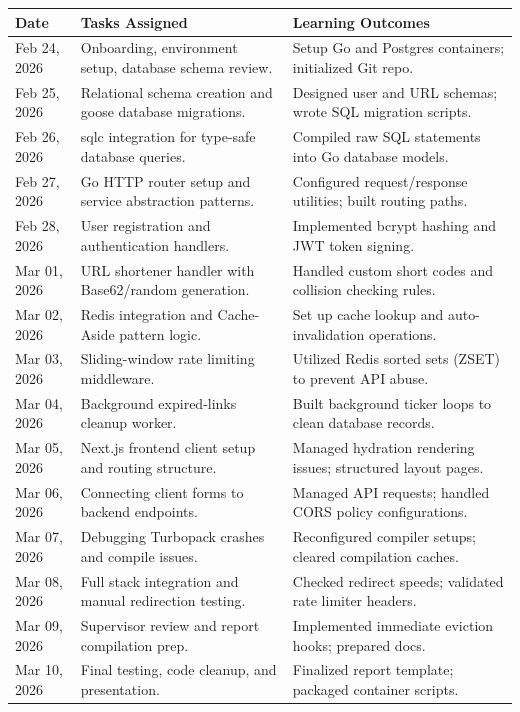 \begin{longtable}{|p{2.5cm}|p{6cm}|p{6.5cm}|}
    \hline
    \textbf{Date} & \textbf{Tasks Assigned} & \textbf{Learning Outcomes} \\
    \hline
    Feb 24, 2026 & Onboarding, environment setup, database schema review. & Setup Go and Postgres containers; initialized Git repo. \\
    \hline
    Feb 25, 2026 & Relational schema creation and goose database migrations. & Designed user and URL schemas; wrote SQL migration scripts. \\
    \hline
    Feb 26, 2026 & sqlc integration for type-safe database queries. & Compiled raw SQL statements into Go database models. \\
    \hline
    Feb 27, 2026 & Go HTTP router setup and service abstraction patterns. & Configured request/response utilities; built routing paths. \\
    \hline
    Feb 28, 2026 & User registration and authentication handlers. & Implemented bcrypt hashing and JWT token signing. \\
    \hline
    Mar 01, 2026 & URL shortener handler with Base62/random generation. & Handled custom short codes and collision checking rules. \\
    \hline
    Mar 02, 2026 & Redis integration and Cache-Aside pattern logic. & Set up cache lookup and auto-invalidation operations. \\
    \hline
    Mar 03, 2026 & Sliding-window rate limiting middleware. & Utilized Redis sorted sets (ZSET) to prevent API abuse. \\
    \hline
    Mar 04, 2026 & Background expired-links cleanup worker. & Built background ticker loops to clean database records. \\
    \hline
    Mar 05, 2026 & Next.js frontend client setup and routing structure. & Managed hydration rendering issues; structured layout pages. \\
    \hline
    Mar 06, 2026 & Connecting client forms to backend endpoints. & Managed API requests; handled CORS policy configurations. \\
    \hline
    Mar 07, 2026 & Debugging Turbopack crashes and compile issues. & Reconfigured compiler setups; cleared compilation caches. \\
    \hline
    Mar 08, 2026 & Full stack integration and manual redirection testing. & Checked redirect speeds; validated rate limiter headers. \\
    \hline
    Mar 09, 2026 & Supervisor review and report compilation prep. & Implemented immediate eviction hooks; prepared docs. \\
    \hline
    Mar 10, 2026 & Final testing, code cleanup, and presentation. & Finalized report template; packaged container scripts. \\
    \hline
\end{longtable}
